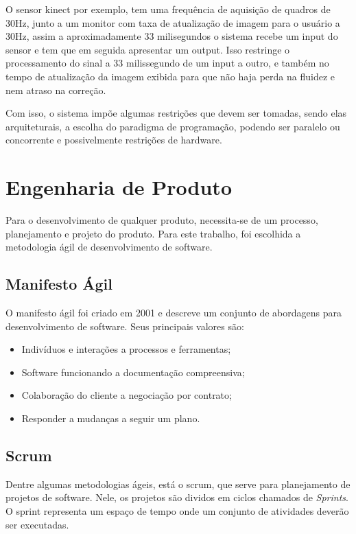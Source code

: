   O sensor kinect \cite{microsoftResearch} por exemplo, tem uma frequência de 
aquisição de quadros de 30Hz, junto a um monitor com taxa de atualização de imagem  
para o usuário a 30Hz, assim a aproximadamente 33 milisegundos o 
sistema recebe um input do sensor e tem que em seguida apresentar um output. Isso
 restringe o processamento do sinal a 33 milissegundo de um input a outro, e 
também no tempo de atualização da imagem exibida para que não haja perda na 
fluidez e nem atraso na correção.

  Com isso, o sistema impõe algumas restrições que devem ser tomadas,
sendo elas arquiteturais, a escolha do  paradigma de programação, podendo ser paralelo ou 
concorrente e possivelmente restrições de hardware.

\section{Engenharia de Produto}
\label{Sec:Engenharia de Produto}
  Para o desenvolvimento de qualquer produto, necessita-se de um processo, 
planejamento e projeto do produto. Para este trabalho, foi escolhida a 
metodologia ágil de desenvolvimento de software.
\subsection{Manifesto Ágil}
\label{Sec:Manifesto Ágil}
  O manifesto ágil foi criado em 2001 e descreve um conjunto de abordagens para
desenvolvimento de software.
  Seus principais valores são:
  \begin{itemize}
  \item Indivíduos e interações a processos e ferramentas;
  \item Software funcionando a documentação compreensiva;
  \item Colaboração do cliente a negociação por contrato;
  \item Responder a mudanças a seguir um plano.\cite{manifestoAgil}
  \end{itemize}

\subsection{Scrum}
\label{Sec:Scrum}
  Dentre algumas metodologias ágeis, está o scrum, que serve para planejamento
de projetos de software. Nele, os projetos são dividos em ciclos chamados de 
\textit{Sprints}. O sprint representa um espaço de tempo onde um conjunto de 
atividades deverão ser executadas.

